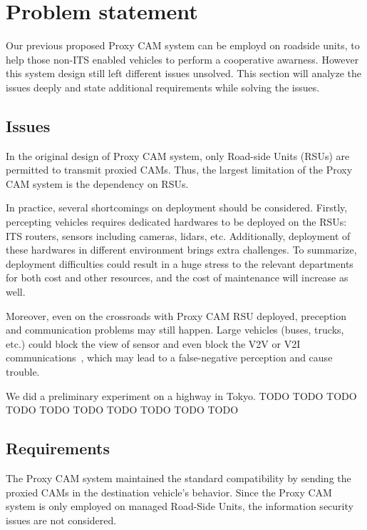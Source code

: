 \section{Problem statement} \label{sec:problem}

Our previous proposed Proxy CAM system can be employd on roadside units,
to help those non-ITS enabled vehicles to perform a cooperative awarness.
However this system design still left different issues unsolved.
This section will analyze the issues deeply and state additional requirements while solving the issues.

\subsection{Issues}
In the original design of Proxy CAM system, only Road-side Units (RSUs) are permitted to transmit proxied CAMs.
Thus, the largest limitation of the Proxy CAM system is the dependency on RSUs.

In practice, several shortcomings on deployment should be considered.
Firstly, percepting vehicles requires dedicated hardwares to be deployed on the RSUs:
ITS routers, sensors including cameras, lidars, etc.
Additionally, deployment of these hardwares in different environment brings extra challenges.
To summarize, deployment difficulties could result in a huge stress to the relevant departments for both cost and other resources,
and the cost of maintenance will increase as well.

Moreover, even on the crossroads with Proxy CAM RSU deployed,
preception and communication problems may still happen.
Large vehicles (buses, trucks, etc.) could block the view of sensor and even block the V2V or V2I communications~\cite{d2014empirical},
which may lead to a false-negative perception and cause trouble.

We did a preliminary experiment on a highway in Tokyo.
TODO TODO TODO TODO TODO TODO TODO TODO TODO TODO

\subsection{Requirements}

The Proxy CAM system maintained the standard compatibility by sending the proxied CAMs in the destination vehicle's behavior.
Since the Proxy CAM system is only employed on managed Road-Side Units, the information security issues are not considered.

